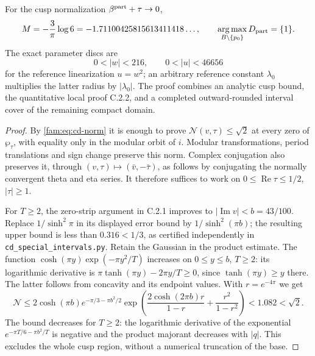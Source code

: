 \begin{theorem}\label{fam:src:C.2.3}\label{fam:st:C.2.3}
For the cusp normalization $\beta^{\rm part}+\tau\to0$,
\[
 M=-\frac3\pi\log6=-1.71100425815613411418\ldots,
 \qquad \operatorname*{arg\,max}_{B\setminus\{p_0\}}D_{\rm part}=\{1\}.
\]
The exact parameter discs are
\[
 0<|w|<216,
 \qquad 0<|u|<46656
\]
for the reference linearization $u=w^2$; an arbitrary reference constant
$\lambda_0$ multiplies the latter radius by $|\lambda_0|$.
The proof combines an analytic cusp bound, the quantitative local proof
C.2.2, and a completed outward-rounded interval cover of the remaining
compact domain.
\end{theorem}
\begin{proof}
By \eqref{fam:eq:cd-norm} it is enough to prove
$\mathcal N(v,\tau)\leq\sqrt2$ at every zero of $\wp_\tau$, with equality
only in the modular orbit of $i$. Modular transformations, period
translations and sign change preserve this norm. Complex conjugation
also preserves it, through
$(v,\tau)\mapsto(\bar v,-\bar\tau)$, as follows by conjugating the
normally convergent theta and eta series. It therefore suffices to work
on $0\leq\operatorname{Re}\tau\leq1/2$, $|\tau|\geq1$.

For $T\geq2$, the zero-strip argument in C.2.1 improves to
$|\operatorname{Im}v|<b=43/100$. Replace $1/\sinh^2\pi$ in its displayed
error bound by $1/\sinh^2(\pi b)$; the resulting upper bound is less
than $0.316<1/3$, as certified independently in
\texttt{cd\_special\_intervals.py}. Retain the Gaussian in the product
estimate. The function
$\cosh(\pi y)\exp(-\pi y^2/T)$ increases on $0\leq y\leq b$, $T\geq2$:
its logarithmic derivative is $\pi\tanh(\pi y)-2\pi y/T\geq0$, since
$\tanh(\pi y)\geq y$ there. The latter follows from concavity and its
endpoint values. With $r=e^{-4\pi}$ we get
\[
 \mathcal N\leq
 2\cosh(\pi b)e^{-\pi/3-\pi b^2/2}
 \exp\left(\frac{2\cosh(2\pi b)r}{1-r}+
                  \frac{r^2}{1-r^2}\right)
 <1.082<\sqrt2.
\]
The bound decreases for $T\geq2$: the logarithmic derivative of the
exponential $e^{-\pi T/6-\pi b^2/T}$ is negative and the product
majorant decreases with $|q|$. This excludes the whole cusp region,
without a numerical truncation of the base.


\end{proof}
